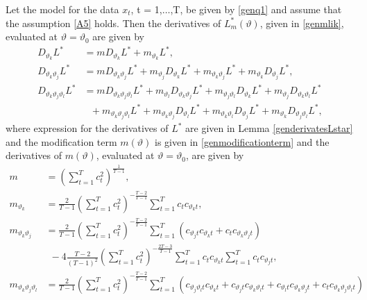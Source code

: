 {{\begin{lemma} \label{genderivatesLstarMCSS}
Let the model for the data $x_t$, t = 1,$\ldots$,T, be given by \eqref{genq1} and assume that the assumption \ref{A5} holds. Then the derivatives of  $L_m^*(\vartheta)$, given in \eqref{genmlik}, evaluated at $\vartheta = \vartheta_0$ are  given by
\begin{align}
    D_{\vartheta_k} L^* &=  m D_{\vartheta_k} L^*   + m_{\vartheta_k} L^*, \label{genmcssqw11}\\
    D_{\vartheta_k \vartheta_j} L^* &=  m D_{\vartheta_k \vartheta_j} L^* + m_{\vartheta_j} D_{\vartheta_k} L^* + m_{\vartheta_k \vartheta_j} L^* +  m_{\vartheta_k} D_{\vartheta_j}L^* ,  \label{genmcssqw12} \\
    D_{\vartheta_k \vartheta_j \vartheta_l} L^* &=  m D_{\vartheta_k \vartheta_j \vartheta_l} L^* +  m_{\vartheta_l} D_{\vartheta_k \vartheta_j} L^* + m_{\vartheta_j \vartheta_l} D_{\vartheta_k} L^* + m_{\vartheta_j} D_{\vartheta_k \vartheta_l} L^*  \nonumber \\
    &\ \ \ + m_{\vartheta_k \vartheta_j \vartheta_l} L^* +  m_{\vartheta_k \vartheta_j } D_{\vartheta_l}L^* + m_{\vartheta_k \vartheta_l} D_{\vartheta_j}L^* + m_{\vartheta_k} D_{\vartheta_j \vartheta_l}L^*, \label{genmcssqw13}
\end{align}
where expression for the derivatives of $L^*$ are given in Lemma \ref{genderivatesLstar} and the modification term $m(\vartheta)$ is given in \eqref{genmodificationterm} and the derivatives of $m(\vartheta)$, evaluated at $\vartheta = \vartheta_0$, are given by
\begin{align*}
   m &= \left( \sum_{t = 1}^T c_t^2 \right)^{\frac{1}{T-1}},  \\
    m_{\vartheta_k} &= \frac{2}{T-1}  \left( \sum_{t = 1}^T c_t^2  \right)^{-\frac{T-2}{T-1}} \sum_{t = 1}^T  c_t  c_{\vartheta_k t},\\
   m_{\vartheta_k \vartheta_j}  &=  \frac{2}{T-1}  \left( \sum_{t = 1}^T c_t^2  \right)^{-\frac{T-2}{T-1}} \sum_{t = 1}^T \left( c_{\vartheta_j t}  c_{\vartheta_k t} + c_t  c_{\vartheta_k \vartheta_j  t}  \right)  \\ &{\ \ } - 4\frac{T-2}{(T-1)^2}  \left( \sum_{t = 1}^T c_t^2 \right)^{-\frac{2T-3}{T-1}} \sum_{t = 1}^T  c_t  c_{\vartheta_k t} \sum_{t = 1}^T  c_t  c_{\vartheta_j t} , \\
    m_{\vartheta_k \vartheta_j  \vartheta_l }  &=  \frac{2}{T-1}  \left( \sum_{t = 1}^T c_t^2  \right)^{-\frac{T-2}{T-1}} \sum_{t = 1}^T \left( c_{\vartheta_j \vartheta_l t}  c_{\vartheta_k t} +  c_{\vartheta_j t}  c_{\vartheta_k \vartheta_l t} + c_{\vartheta_l t}  c_{\vartheta_k \vartheta_j  t} + c_t  c_{\vartheta_k \vartheta_j \vartheta_l t}  \right)  \\ 

\end{align*}
\end{lemma}}}
